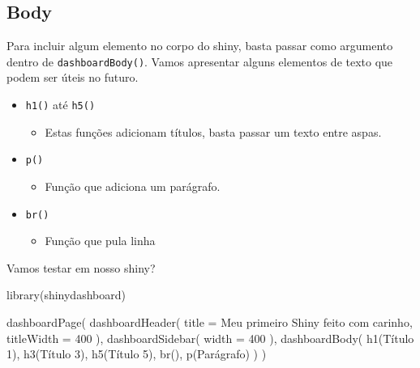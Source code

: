 \documentclass[
]{book}
\newenvironment{Shaded}{\begin{snugshade}}{\end{snugshade}}
\newcommand{\AttributeTok}[1]{\textcolor[rgb]{0.77,0.63,0.00}{#1}}
\newcommand{\DecValTok}[1]{\textcolor[rgb]{0.00,0.00,0.81}{#1}}
\newcommand{\FunctionTok}[1]{\textcolor[rgb]{0.00,0.00,0.00}{#1}}
\newcommand{\NormalTok}[1]{#1}
\newcommand{\StringTok}[1]{\textcolor[rgb]{0.31,0.60,0.02}{#1}}
\providecommand{\tightlist}{%
  \setlength{\itemsep}{0pt}\setlength{\parskip}{0pt}}
\begin{document}
\hypertarget{body}{%
\subsection{Body}\label{body}}

Para incluir algum elemento no corpo do shiny, basta passar como argumento dentro de \texttt{dashboardBody()}. Vamos apresentar alguns elementos de texto que podem ser úteis no futuro.

\begin{itemize}
\tightlist
\item
  \texttt{h1()} até \texttt{h5()}

  \begin{itemize}
  \tightlist
  \item
    Estas funções adicionam títulos, basta passar um texto entre aspas.
  \end{itemize}
\item
  \texttt{p()}

  \begin{itemize}
  \tightlist
  \item
    Função que adiciona um parágrafo.
  \end{itemize}
\item
  \texttt{br()}

  \begin{itemize}
  \tightlist
  \item
    Função que pula linha
  \end{itemize}
\end{itemize}

Vamos testar em nosso shiny?

\begin{Shaded}
\begin{Highlighting}[]
\FunctionTok{library}\NormalTok{(shinydashboard)}

\FunctionTok{dashboardPage}\NormalTok{(}
  \FunctionTok{dashboardHeader}\NormalTok{(}
    \AttributeTok{title =} \StringTok{\textquotesingle{}Meu primeiro Shiny feito com carinho\textquotesingle{}}\NormalTok{,}
    \AttributeTok{titleWidth =} \DecValTok{400}
\NormalTok{  ),}
  \FunctionTok{dashboardSidebar}\NormalTok{(}
    \AttributeTok{width =} \DecValTok{400}
\NormalTok{  ),}
  \FunctionTok{dashboardBody}\NormalTok{(}
    \FunctionTok{h1}\NormalTok{(}\StringTok{\textquotesingle{}Título 1\textquotesingle{}}\NormalTok{),}
    \FunctionTok{h3}\NormalTok{(}\StringTok{\textquotesingle{}Título 3\textquotesingle{}}\NormalTok{),}
    \FunctionTok{h5}\NormalTok{(}\StringTok{\textquotesingle{}Título 5\textquotesingle{}}\NormalTok{),}
    \FunctionTok{br}\NormalTok{(),}
    \FunctionTok{p}\NormalTok{(}\StringTok{\textquotesingle{}Parágrafo\textquotesingle{}}\NormalTok{)}
\NormalTok{  )}
\NormalTok{)}
\end{Highlighting}
\end{Shaded}
\end{document}
